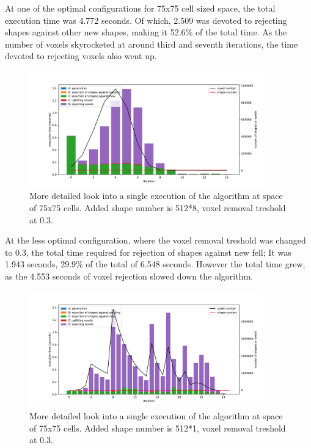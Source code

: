 \documentclass[12pt, oneside]{report}
\begin{document}
At one of the optimal configurations for 75x75 cell sized space, the total execution time was 4.772 seconds. Of which, 2.509 was devoted to rejecting shapes against other new shapes, making it 52.6\% of the total time. As the number of voxels skyrocketed at around third and seventh iterations, the time devoted to rejecting voxels also went up.

\begin{figure}[H]
  \centering
	\includegraphics[width=0.9\textwidth,keepaspectratio]{Images/SummaryOptimisation/iter_75_512x8_03.pdf}
	\caption{More detailed look into a single execution of the algorithm at space of 75x75 cells. Added shape number is 512*8, voxel removal treshold at 0.3.}
	\label{summary_detail_75_512x8_03}
\end{figure}

At the less optimal configuration, where the voxel removal treshold was changed to 0.3, the total time required for rejection of shapes against new fell; It was 1.943 seconds, 29.9\% of the total of 6.548 seconds. However the total time grew, as the 4.553 seconds of voxel rejection slowed down the algorithm.

\begin{figure}[H]
  \centering
	\includegraphics[width=0.9\textwidth,keepaspectratio]{Images/SummaryOptimisation/iter_75_512x1_03.pdf}
	\caption{More detailed look into a single execution of the algorithm at space of 75x75 cells. Added shape number is 512*1, voxel removal treshold at 0.3.}
	\label{summary_detail_75_512x1_03}
\end{figure}
\end{document}
